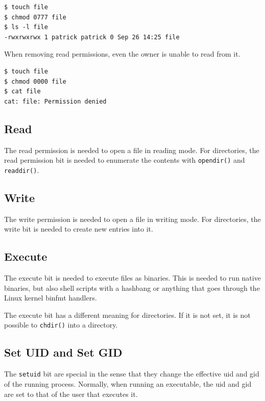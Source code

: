 \documentclass[a4paper]{article}
\begin{document}
\begin{verbatim}
$ touch file
$ chmod 0777 file
$ ls -l file
-rwxrwxrwx 1 patrick patrick 0 Sep 26 14:25 file  
\end{verbatim}
When removing read permissions, even the owner is unable to read from it.

\begin{verbatim}
$ touch file
$ chmod 0000 file
$ cat file
cat: file: Permission denied
\end{verbatim}

\subsection{Read}

The read permission is needed to open a file in reading mode. For directories, the read permission bit is needed to enumerate the contents with \verb|opendir()| and \verb|readdir()|.

\subsection{Write}

The write permission is needed to open a file in writing mode. For directories, the write bit is needed to create new entries into it.

\subsection{Execute}

The execute bit is needed to execute files as binaries. This is needed to run native binaries, but also shell scripts with a hashbang or anything that goes through the Linux kernel binfmt handlers.


The execute bit has a different meaning for directories. If it is not set, it is not possible to \verb|chdir()| into a directory.

\subsection{Set UID and Set GID}

The \verb|setuid| bit are special in the sense that they change the effective \gls{uid} and \gls{gid} of the running process. Normally, when running an executable, the \gls{uid} and \gls{gid} are set to that of the user that executes it.
\end{document}

